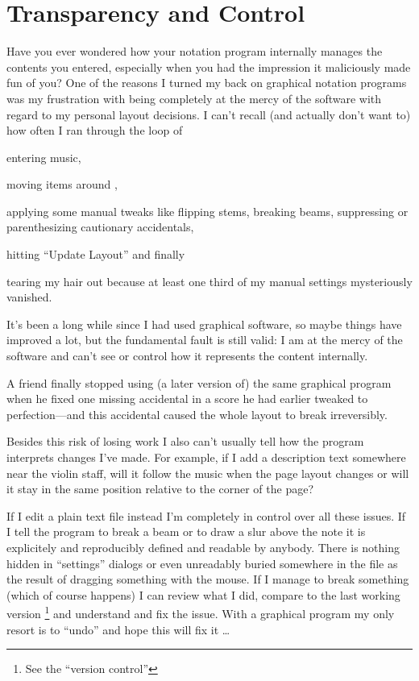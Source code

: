 \documentclass[../../LilyPond-Tutorials]{subfiles}
\begin{document}
\section{Transparency and Control}
\label{sec:pt_transparency-and-control}
Have you ever wondered how your notation program internally
manages the contents you entered, especially when you had the
impression it maliciously made fun of you?
One of the reasons I turned my back on graphical notation
programs was my frustration with being completely at the mercy of
the software with regard to my personal layout decisions.
I can't recall (and actually don't want to) how often I ran
through the loop of
\begin{inparaenum}[1.)]
\item entering music,
\item moving items around ,
\item applying some manual tweaks like flipping stems, breaking
beams, suppressing or parenthesizing cautionary accidentals,
\item hitting “Update Layout” and finally
\item tearing my hair out because at least one third of my manual
settings mysteriously vanished.
\end{inparaenum}

It's been a long while since I had used graphical software, so
maybe things have improved a lot, but the fundamental fault is
still valid: 
I am at the mercy of the software and can't see or control how it
represents the content internally.

A friend finally stopped using (a later version of) the same
graphical program when he fixed one missing accidental in a score
he had earlier tweaked to perfection---and this accidental caused
the whole layout to break irreversibly.

Besides this risk of losing work I also can't usually tell how
the program
interprets changes I've made.  For example, if I add a
description text
somewhere near the violin staff, will it follow the music when
the page layout
changes or will it stay in the same position relative to the
corner of the page?

\medskip
{}

\medskip
If I edit a plain text file instead I'm completely in control
over all these issues.
If I tell the program to break a beam or to draw a slur above the
note it is explicitely and reproducibly defined and readable by
anybody.
There is nothing hidden in “settings” dialogs or even unreadably
buried somewhere in the file as the result of dragging something
with the mouse.
If I manage to break something (which of course happens) I can
review what I did, compare to the last working version%
\footnote{See the “version control”
}
and understand and fix the issue.
With a graphical program my only resort is to “undo” and hope
this will fix it \dots
\end{document}
